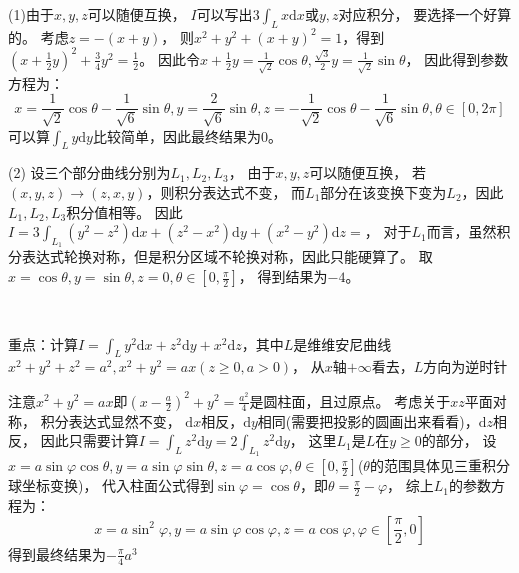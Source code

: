 \begin{solution}
  (1)由于$x,y,z$可以随便互换，
  $I$可以写出$3 \int_L x\mathrm{d} x$或$y,z$对应积分，
  要选择一个好算的。
  考虑$z = -(x + y)$，
  则$x^2 + y^2 + (x + y)^2 = 1$，得到$(x + \frac{1}{2}y)^2 + \frac{3}{4}y^2 = \frac{1}{2}$。
  因此令$x + \frac{1}{2}y = \frac{1}{\sqrt{2}} \cos \theta, \frac{\sqrt{3}}{2}y = \frac{1}{\sqrt{2}}\sin \theta$，
  因此得到参数方程为：
  \begin{equation*}
    x = \frac{1}{\sqrt{2}} \cos \theta - \frac{1}{\sqrt{6}} \sin \theta, y = \frac{2}{\sqrt{6}}\sin \theta, z = - \frac{1}{\sqrt{2}} \cos \theta - \frac{1}{\sqrt{6}} \sin \theta, \theta \in [0,2\pi]
  \end{equation*}
  可以算$\int_L y\mathrm{d} y$比较简单，因此最终结果为$0$。

  (2)
  设三个部分曲线分别为$L_1,L_2,L_3$，
  由于$x,y,z$可以随便互换，
  若$(x,y,z) \rightarrow (z,x,y)$，则积分表达式不变，
  而$L_1$部分在该变换下变为$L_2$，因此$L_1,L_2,L_3$积分值相等。
  因此$I = 3 \int_{L_1} (y^2 - z^2)\mathrm{d} x + (z^2 - x^2)\mathrm{d} y + (x^2 - y^2)\mathrm{d} z = $，
  对于$L_1$而言，虽然积分表达式轮换对称，但是积分区域不轮换对称，因此只能硬算了。
  取$x = \cos \theta, y = \sin \theta, z = 0,\theta \in [0,\frac{\pi}{2}]$，
  得到结果为$-4$。

\end{solution}

~

\begin{exercise}
  重点：计算$I = \int_L y^2 \mathrm{d} x + z^2 \mathrm{d} y + x^2 \mathrm{d} z$，其中$L$是维维安尼曲线
  $x^2 + y^2 + z^2 = a^2, x^2 + y^2 = ax(z \geq 0, a > 0)$，
  从$x$轴$+\infty$看去，$L$方向为逆时针
\end{exercise}

\begin{solution}
  注意$x^2 + y^2 = ax$即$(x - \frac{a}{2})^2 + y^2 = \frac{a^2}{4}$是圆柱面，且过原点。
  考虑关于$xz$平面对称，
  积分表达式显然不变，
  $\mathrm{d} x$相反，$\mathrm{d} y$相同(需要把投影的圆画出来看看)，$\mathrm{d} z$相反，
  因此只需要计算$I = \int_L z^2 \mathrm{d} y = 2\int_{L_1} z^2 \mathrm{d} y$，
  这里$L_1$是$L$在$y \geq 0$的部分，
  设$x = a \sin \varphi \cos \theta, y = a \sin \varphi \sin \theta, z = a \cos \varphi, \theta \in [0,\frac{\pi}{2}]$($\theta$的范围具体见三重积分球坐标变换)，
  代入柱面公式得到$\sin \varphi = \cos \theta$，即$\theta = \frac{\pi}{2} - \varphi$，
  综上$L_1$的参数方程为：
  \begin{equation*}
    x = a \sin^2 \varphi, y = a \sin \varphi \cos \varphi, z = a \cos \varphi, \varphi \in [\frac{\pi}{2}, 0]
  \end{equation*}
  得到最终结果为$-\frac{\pi}{4}a^3$
\end{solution}

